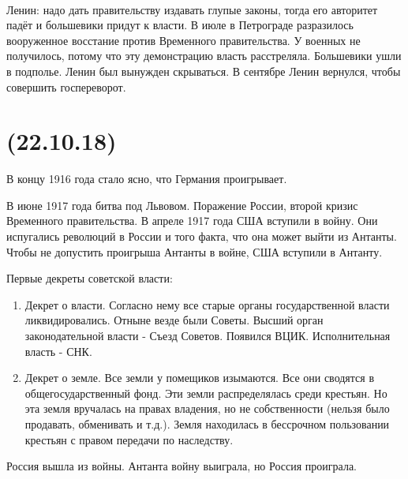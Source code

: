 \documentclass[dvipdfmx]{article}
\begin{document}
\paragraph{}
Ленин: надо дать правительству издавать глупые законы, тогда его авторитет падёт и большевики придут к власти.
В июле в Петрограде разразилось вооруженное восстание против Временного правительства.
У военных не получилось, потому что эту
демонстрацию власть расстреляла. Большевики ушли в подполье. Ленин был вынужден скрываться.
В сентябре Ленин вернулся, чтобы совершить госпереворот.

\newpage
\noindent\makebox[\linewidth]{\rule{\paperwidth}{0.4pt}}
\section{(22.10.18)}
\noindent\makebox[\linewidth]{\rule{\paperwidth}{0.4pt}}

В концу 1916 года стало ясно, что Германия проигрывает.

В июне 1917 года битва под Львовом. Поражение России, второй кризис Временного правительства.
В апреле 1917 года США вступили в войну. Они испугались революций в России и того факта, что она может выйти из Антанты.
Чтобы не допустить проигрыша Антанты в войне, США вступили в Антанту.

Первые декреты советской власти:

\begin{enumerate}
\item
  Декрет о власти. Согласно нему все старые органы государственной власти ликвидировались. Отныне везде были Советы.
  Высший орган законодательной власти - Съезд Советов. Появился ВЦИК. Исполнительная власть - СНК.
\item
  Декрет о земле. Все земли у помещиков изымаются. Все они сводятся в общегосударственный фонд. Эти земли распределялась
  среди крестьян.
  Но эта земля вручалась на правах владения, но не собственности (нельзя было продавать, обменивать и т.д.).
  Земля находилась в бессрочном пользовании крестьян с правом передачи по наследству.  
\end{enumerate}

Россия вышла из войны.
Антанта войну выиграла, но Россия проиграла.
\end{document}
